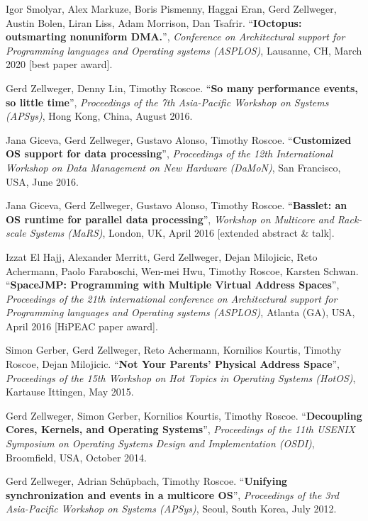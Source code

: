 \documentclass[margin,line]{cv/cv}
\begin{document}
\begin{resume}
    Igor Smolyar, Alex Markuze, Boris Pismenny, Haggai Eran, Gerd Zellweger, Austin Bolen, Liran Liss, Adam Morrison, Dan Tsafrir.
    ``\textbf{IOctopus: outsmarting nonuniform DMA.}'', \textsl{Conference on Architectural support for Programming languages and Operating systems (ASPLOS)}, Lausanne, CH, March 2020 [best paper award].

    Gerd Zellweger, Denny Lin, Timothy Roscoe.
    ``\textbf{So many performance events, so little time}'', \textsl{Proceedings of the 7th Asia-Pacific Workshop on Systems (APSys)}, Hong Kong, China, August 2016.

    Jana Giceva, Gerd Zellweger, Gustavo Alonso, Timothy Roscoe.
    ``\textbf{Customized OS support for data processing}'',
    \textsl{Proceedings of the 12th International Workshop on Data Management on New Hardware (DaMoN)}, San Francisco, USA, June 2016.

    Jana Giceva, Gerd Zellweger, Gustavo Alonso, Timothy Roscoe.
    ``\textbf{Basslet: an OS runtime for parallel data processing}'',
    \textsl{Workshop on Multicore and Rack-scale Systems (MaRS)}, London, UK, April 2016 [extended abstract \& talk].

    Izzat El Hajj, Alexander Merritt, Gerd Zellweger, Dejan Milojicic, Reto Achermann, Paolo Faraboschi, Wen-mei Hwu, Timothy Roscoe, Karsten Schwan.
    ``\textbf{SpaceJMP: Programming with Multiple Virtual Address Spaces}'',  \textsl{Proceedings of the 21th international conference on Architectural support for Programming languages and Operating systems (ASPLOS)}, Atlanta (GA), USA, April 2016 [HiPEAC paper award].

    Simon Gerber, Gerd Zellweger, Reto Achermann, Kornilios Kourtis, Timothy Roscoe, Dejan Milojicic.
    ``\textbf{Not Your Parents' Physical Address Space}'', \textsl{Proceedings of the 15th Workshop on Hot Topics in Operating Systems (HotOS)}, Kartause Ittingen, May 2015.

    Gerd Zellweger, Simon Gerber, Kornilios Kourtis, Timothy Roscoe.
    ``\textbf{Decoupling Cores, Kernels, and Operating Systems}'',
    \textsl{Proceedings of the 11th USENIX Symposium on Operating Systems Design and Implementation (OSDI)}, Broomfield, USA, October 2014.

    Gerd Zellweger, Adrian Schüpbach, Timothy Roscoe.
    ``\textbf{Unifying synchronization and events in a multicore OS}'',
    \textsl{Proceedings of the 3rd Asia-Pacific Workshop on Systems (APSys)}, Seoul, South Korea, July 2012.


    \pagebreak


\end{resume}
\end{document}
